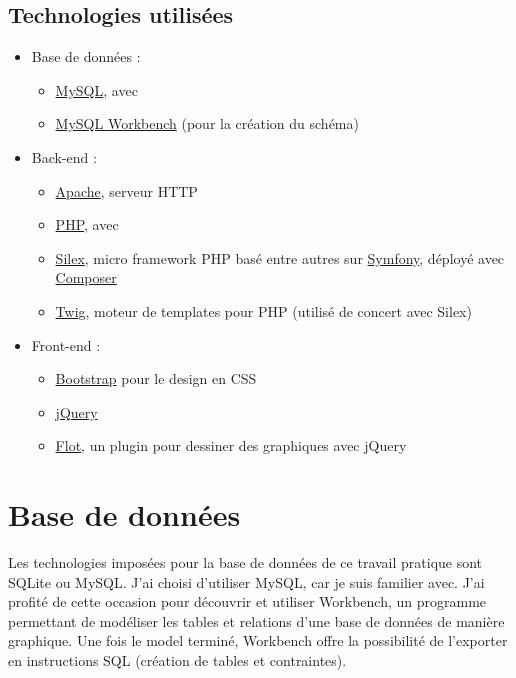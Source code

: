 \documentclass[a4paper, 12pt]{article}
\begin{document}
\subsection{Technologies utilisées}
\begin{itemize}
	\item Base de données :
	\begin{itemize}
		\item \href{https://www.mysql.com/}{MySQL}, avec
		\item \href{https://www.mysql.com/products/workbench/}{MySQL Workbench} (pour la création du schéma)
	\end{itemize}
	\item Back-end :
	\begin{itemize}
		\item \href{https://httpd.apache.org/}{Apache}, serveur HTTP
		\item \href{http://php.net/}{PHP}, avec
		\item \href{https://silex.symfony.com/}{Silex}, micro framework PHP basé entre autres sur \href{https://symfony.com/}{Symfony}, déployé avec \href{https://getcomposer.org/}{Composer}
		\item \href{https://twig.symfony.com/}{Twig}, moteur de templates pour PHP (utilisé de concert avec Silex)
	\end{itemize}
	\item Front-end :
	\begin{itemize}
		\item \href{http://getbootstrap.com/}{Bootstrap} pour le design en CSS
		\item \href{https://jquery.org/}{jQuery}
		\item \href{http://www.flotcharts.org/}{Flot}, un plugin pour dessiner des graphiques avec jQuery
	\end{itemize}
\end{itemize}


\section{Base de données}
Les technologies imposées pour la base de données de ce travail pratique sont SQLite ou MySQL. J'ai choisi d'utiliser 
MySQL, car je suis familier avec. J'ai profité de cette occasion pour découvrir et utiliser Workbench, un programme 
permettant de modéliser les tables et relations d'une base de données de manière graphique. Une fois le model terminé, 
Workbench offre la possibilité de l'exporter en instructions SQL (création de tables et contraintes).
\bigbreak
\end{document}

